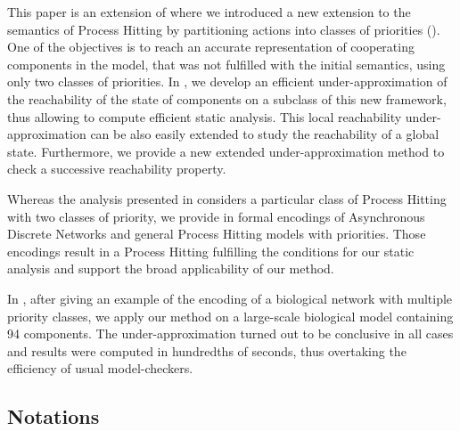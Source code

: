 This paper is an extension of \cite{FPMR13-CS2Bio} where we
introduced a new extension to the semantics of Process Hitting by partitioning actions into classes of priorities
().
One of the objectives is to reach an accurate representation of cooperating components in the model, that was not fulfilled with the initial semantics, using only two classes of priorities.
In ,
we develop an efficient under-approximation of the reachability of the state of components on a subclass of this new framework, thus allowing to compute efficient static analysis.
This local reachability under-approximation can be also easily extended to study the reachability of a global state.
Furthermore, we provide a new extended under-approximation method to check a successive reachability property.

Whereas the analysis presented in  considers a particular class of
Process Hitting with two classes of priority,
we provide in  formal encodings of Asynchronous Discrete Networks and general
Process Hitting models with priorities.
Those encodings result in a Process Hitting fulfilling the conditions for our
static analysis and support the broad applicability of our method.

In , after giving an example of the encoding of a biological
network with multiple priority classes,
we apply our method on a large-scale biological model containing 94 components.
The under-approximation turned out to be conclusive in all cases and results were computed in hundredths of seconds,
thus overtaking the efficiency of usual model-checkers.




\subsection*{Notations}
\label{notations}

